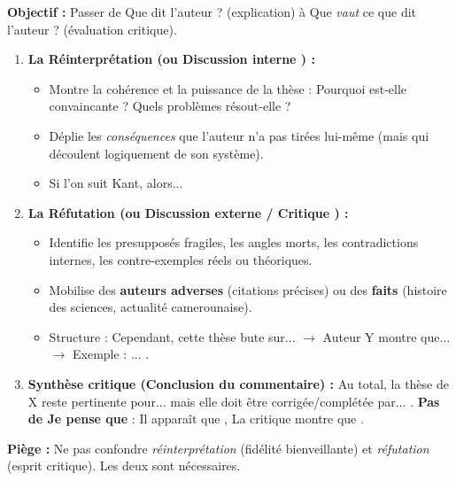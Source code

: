 \documentclass[11pt]{article}
\newcommand{\cle}[1]{{\popxbold\color{popdark}#1}}
\begin{document}
\begin{methode}
    \textbf{Objectif :} Passer de \guillemotleft Que dit l'auteur ? \guillemotright (explication) à \guillemotleft Que \emph{vaut} ce que dit l'auteur ? \guillemotright (évaluation critique).
    \begin{enumerate}
        \item \textbf{La Réinterprétation (ou \guillemotleft Discussion interne \guillemotright) :}
        \begin{itemize}
            \item Montre la \cle{cohérence} et la \cle{puissance} de la thèse : Pourquoi est-elle convaincante ? Quels problèmes résout-elle ?
            \item Déplie les \emph{conséquences} que l'auteur n'a pas tirées lui-même (mais qui découlent logiquement de son système).
            \item \guillemotleft Si l'on suit Kant, alors... \guillemotright
        \end{itemize}
        \item \textbf{La Réfutation (ou \guillemotleft Discussion externe / Critique \guillemotright) :}
        \begin{itemize}
            \item Identifie les \cle{presupposés} fragiles, les \cle{angles morts}, les \cle{contradictions} internes, les \cle{contre-exemples} réels ou théoriques.
            \item Mobilise des \textbf{auteurs adverses} (citations précises) ou des \textbf{faits} (histoire des sciences, actualité camerounaise).
            \item Structure : \guillemotleft Cependant, cette thèse bute sur... \guillemotright $\rightarrow$ \guillemotleft Auteur Y montre que... \guillemotright $\rightarrow$ \guillemotleft Exemple : ... \guillemotright.
        \end{itemize}
        \item \textbf{Synthèse critique (Conclusion du commentaire) :} \guillemotleft Au total, la thèse de X reste pertinente pour... mais elle doit être corrigée/complétée par... \guillemotright. \textbf{Pas de \guillemotleft Je pense que \guillemotright} : \guillemotleft Il apparaît que \guillemotright, \guillemotleft La critique montre que \guillemotright.
    \end{enumerate}
    \textbf{Piège :} Ne pas confondre \emph{réinterprétation} (fidélité bienveillante) et \emph{réfutation} (esprit critique). Les deux sont nécessaires.
\end{methode}
\end{document}
